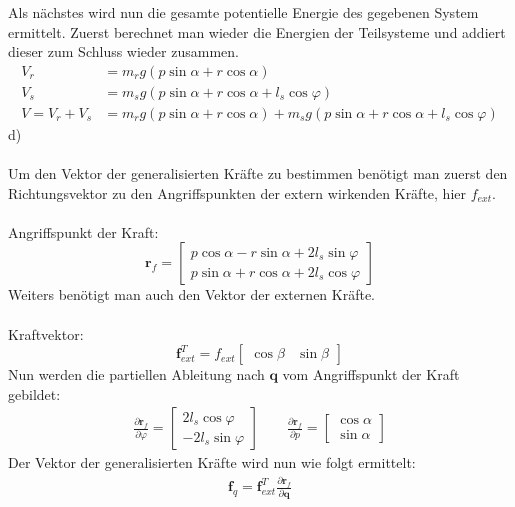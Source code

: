 	\noindent
	Als nächstes wird nun die gesamte potentielle Energie des gegebenen System ermittelt. Zuerst berechnet man wieder die Energien der Teilsysteme und addiert dieser zum Schluss wieder zusammen.
	\begin{align*}
		V_r &= m_rg\left(p\sin\alpha + r\cos\alpha\right) \\
		V_s &= m_sg\left(p\sin\alpha + r\cos\alpha + l_s\cos\varphi\right) \\
		V = V_r + V_s &= m_rg\left(p\sin\alpha + r\cos\alpha\right) + m_sg\left(p\sin\alpha + r\cos\alpha + l_s\cos\varphi\right)
	\end{align*}
	d)\\ \\
	Um den Vektor der generalisierten Kräfte zu bestimmen benötigt man zuerst den Richtungsvektor zu den Angriffspunkten der extern wirkenden Kräfte, hier $f_{ext}$. \\ \\
	Angriffspunkt der Kraft:
	\[
		\textbf{r}_f = \left[\begin{matrix}
			p\cos\alpha - r\sin\alpha + 2l_s\sin\varphi \\
			p\sin\alpha + r\cos\alpha + 2l_s\cos\varphi
		\end{matrix}\right]
	\]
	Weiters benötigt man auch den Vektor der externen Kräfte. \\ \\
	Kraftvektor:
	\[
		\textbf{f}_{ext}^T = f_{ext}\left[\begin{matrix}
			\cos\beta & \sin\beta
		\end{matrix}\right]
	\]
	Nun werden die partiellen Ableitung nach $\textbf{q}$ vom Angriffspunkt der Kraft gebildet:
	\begin{align*}
		\frac{\partial\textbf{r}_f}{\partial\varphi} = \left[\begin{matrix}
			2l_s\cos\varphi \\
			-2l_s\sin\varphi
		\end{matrix}\right] \qquad
		\frac{\partial\textbf{r}_f}{\partial p} = \left[\begin{matrix}
			\cos\alpha \\
			\sin\alpha
		\end{matrix}\right]
	\end{align*}
	Der Vektor der generalisierten Kräfte wird nun wie folgt ermittelt:
	\begin{align*}
		\textbf{f}_q = \textbf{f}_{ext}^T \frac{\partial \textbf{r}_f}{\partial \textbf{q}}
	\end{align*}
